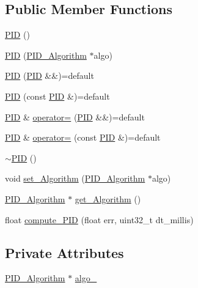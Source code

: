 \subsection*{Public Member Functions}
\begin{DoxyCompactItemize}
\item 
\mbox{\hyperlink{class_p_i_d_a0311b6f7de348499ce24e53ba353514a}{P\+ID}} ()
\item 
\mbox{\hyperlink{class_p_i_d_a3dec056234c6c626fd2265041b75b373}{P\+ID}} (\mbox{\hyperlink{class_p_i_d___algorithm}{P\+I\+D\+\_\+\+Algorithm}} $\ast$algo)
\item 
\mbox{\hyperlink{class_p_i_d_ac7e806bc5c09badd95a1209f13b0b2d9}{P\+ID}} (\mbox{\hyperlink{class_p_i_d}{P\+ID}} \&\&)=default
\item 
\mbox{\hyperlink{class_p_i_d_ab974b1244b215183b3dddd136c5f8198}{P\+ID}} (const \mbox{\hyperlink{class_p_i_d}{P\+ID}} \&)=default
\item 
\mbox{\hyperlink{class_p_i_d}{P\+ID}} \& \mbox{\hyperlink{class_p_i_d_ac4ec6b4822395c58b0d50c0265b18369}{operator=}} (\mbox{\hyperlink{class_p_i_d}{P\+ID}} \&\&)=default
\item 
\mbox{\hyperlink{class_p_i_d}{P\+ID}} \& \mbox{\hyperlink{class_p_i_d_ad2eaf8a497ab2c737fd167d6d6e28c91}{operator=}} (const \mbox{\hyperlink{class_p_i_d}{P\+ID}} \&)=default
\item 
\mbox{\hyperlink{class_p_i_d_ab7d389fc5b88d881bc25f5dafd360441}{$\sim$\+P\+ID}} ()
\item 
void \mbox{\hyperlink{class_p_i_d_af9dc86555b8f221ca9d19f393e179196}{set\+\_\+\+Algorithm}} (\mbox{\hyperlink{class_p_i_d___algorithm}{P\+I\+D\+\_\+\+Algorithm}} $\ast$algo)
\item 
\mbox{\hyperlink{class_p_i_d___algorithm}{P\+I\+D\+\_\+\+Algorithm}} $\ast$ \mbox{\hyperlink{class_p_i_d_a940bbf0c834f0ac68203b8e28b2ca8d1}{get\+\_\+\+Algorithm}} ()
\item 
float \mbox{\hyperlink{class_p_i_d_a4d19abca579301069c3edb28fd5ff7f2}{compute\+\_\+\+P\+ID}} (float err, uint32\+\_\+t dt\+\_\+millis)
\end{DoxyCompactItemize}
\subsection*{Private Attributes}
\begin{DoxyCompactItemize}
\item 
\mbox{\hyperlink{class_p_i_d___algorithm}{P\+I\+D\+\_\+\+Algorithm}} $\ast$ \mbox{\hyperlink{class_p_i_d_a00da8f79183718c3326bc5322f77b5f9}{algo\+\_\+}}
\end{DoxyCompactItemize}


